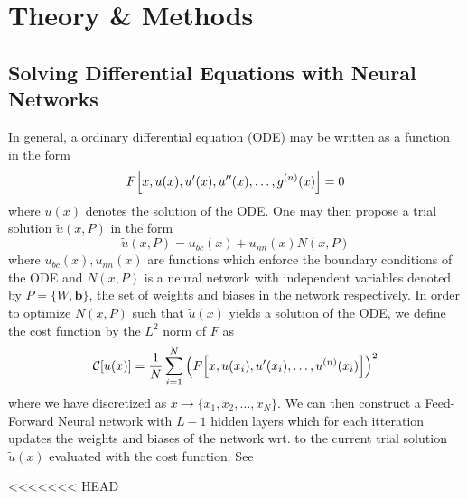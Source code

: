 \documentclass[reprint, english, nofootinbib]{revtex4-2}
\begin{document}
\section{Theory \& Methods}

\subsection{Solving Differential Equations with Neural Networks}
\noindent
In general, a ordinary differential equation (ODE) may be written as a function in the form
\begin{equation}
    F \qty[x, u(x), u'(x), u''(x), \dots, g^{(n)}(x)] = 0
\end{equation}    
where $u(x)$ denotes the solution of the ODE. One may then propose a trial solution $\tilde u(x,P)$ in the form
\begin{equation}
    \tilde u(x, P) = u_{bc}(x) + u_{nn}(x)N(x, P) 
\end{equation}
where $u_{bc}(x), u_{nn}(x)$ are functions which enforce the boundary conditions of the ODE and $N(x, P)$ is a neural network with independent variables denoted by $P = \{W, \pmb b\}$, the set of weights and biases in the network respectively. In order to optimize $N(x, P)$ such that $\tilde u(x)$ yields a solution of the ODE, we define the cost function by the $L^2$ norm of $F$ as
\begin{equation}
    \mathcal C\qty[u\qty(x)] = \frac{1}{N} \sum_{i=1}^{N}\qty(F\qty[x, u(x_i), u'(x_i), \dots, u^{(n)}(x_i)])^2
\end{equation}
where we have discretized as $x \rightarrow \{x_1, x_2 ,\dots, x_{N}\}$. We can then construct a Feed-Forward Neural network with $L-1$ hidden layers which for each itteration updates the weights and biases of the network wrt. to the current trial solution $\tilde u(x)$ evaluated with the cost function. See \cite{4155_project_2}

<<<<<<< HEAD
\end{document}
